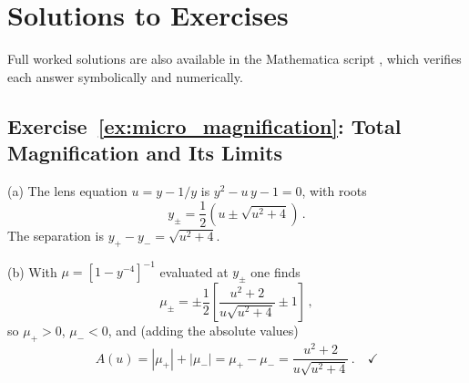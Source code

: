 
\section{Solutions to Exercises}
\label{sec:micro_solutions}

\noindent
Full worked solutions are also available in the Mathematica script
,
which verifies each answer symbolically and numerically.

\subsection*{Exercise~\ref{ex:micro_magnification}: Total Magnification and Its Limits}

(a) The lens equation $u = y - 1/y$ is $y^2 - u\,y - 1 = 0$, with
roots
\begin{equation*}
    y_\pm = \frac{1}{2}\left(u \pm \sqrt{u^2 + 4}\right) \,.
\end{equation*}
The separation is $y_+ - y_- = \sqrt{u^2+4}$. \checkmark

(b) With $\mu = [1 - y^{-4}]^{-1}$ evaluated at $y_\pm$ one finds
\begin{equation*}
    \mu_\pm = \pm\frac{1}{2}\left[\frac{u^2+2}{u\sqrt{u^2+4}} \pm 1\right] \,,
\end{equation*}
so $\mu_+ > 0$, $\mu_- < 0$, and (adding the absolute values)
\begin{equation*}
    A(u) = |\mu_+| + |\mu_-| = \mu_+ - \mu_-
    = \frac{u^2 + 2}{u\sqrt{u^2 + 4}} \,. \quad \checkmark
\end{equation*}

